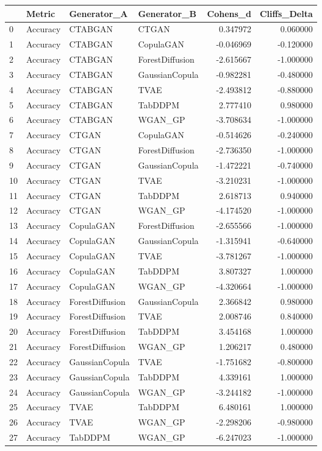 \begin{tabular}{llllrr}
\toprule
 & Metric & Generator_A & Generator_B & Cohens_d & Cliffs_Delta \\
\midrule
0 & Accuracy & CTABGAN & CTGAN & 0.347972 & 0.060000 \\
1 & Accuracy & CTABGAN & CopulaGAN & -0.046969 & -0.120000 \\
2 & Accuracy & CTABGAN & ForestDiffusion & -2.615667 & -1.000000 \\
3 & Accuracy & CTABGAN & GaussianCopula & -0.982281 & -0.480000 \\
4 & Accuracy & CTABGAN & TVAE & -2.493812 & -0.880000 \\
5 & Accuracy & CTABGAN & TabDDPM & 2.777410 & 0.980000 \\
6 & Accuracy & CTABGAN & WGAN_GP & -3.708634 & -1.000000 \\
7 & Accuracy & CTGAN & CopulaGAN & -0.514626 & -0.240000 \\
8 & Accuracy & CTGAN & ForestDiffusion & -2.736350 & -1.000000 \\
9 & Accuracy & CTGAN & GaussianCopula & -1.472221 & -0.740000 \\
10 & Accuracy & CTGAN & TVAE & -3.210231 & -1.000000 \\
11 & Accuracy & CTGAN & TabDDPM & 2.618713 & 0.940000 \\
12 & Accuracy & CTGAN & WGAN_GP & -4.174520 & -1.000000 \\
13 & Accuracy & CopulaGAN & ForestDiffusion & -2.655566 & -1.000000 \\
14 & Accuracy & CopulaGAN & GaussianCopula & -1.315941 & -0.640000 \\
15 & Accuracy & CopulaGAN & TVAE & -3.781267 & -1.000000 \\
16 & Accuracy & CopulaGAN & TabDDPM & 3.807327 & 1.000000 \\
17 & Accuracy & CopulaGAN & WGAN_GP & -4.320664 & -1.000000 \\
18 & Accuracy & ForestDiffusion & GaussianCopula & 2.366842 & 0.980000 \\
19 & Accuracy & ForestDiffusion & TVAE & 2.008746 & 0.840000 \\
20 & Accuracy & ForestDiffusion & TabDDPM & 3.454168 & 1.000000 \\
21 & Accuracy & ForestDiffusion & WGAN_GP & 1.206217 & 0.480000 \\
22 & Accuracy & GaussianCopula & TVAE & -1.751682 & -0.800000 \\
23 & Accuracy & GaussianCopula & TabDDPM & 4.339161 & 1.000000 \\
24 & Accuracy & GaussianCopula & WGAN_GP & -3.244182 & -1.000000 \\
25 & Accuracy & TVAE & TabDDPM & 6.480161 & 1.000000 \\
26 & Accuracy & TVAE & WGAN_GP & -2.298206 & -0.980000 \\
27 & Accuracy & TabDDPM & WGAN_GP & -6.247023 & -1.000000 \\
\bottomrule
\end{tabular}
